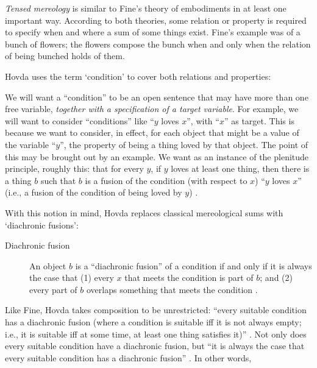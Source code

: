 \documentclass[11pt]{article}
\newenvironment{squote}{%
\begin{spacing}{1}
\begin{list}{}{%
\setlength{\labelwidth}{0pt}%
\rightmargin\leftmargin%
}
\item\relax
}{%
\end{list}%
\end{spacing}
}
\begin{document}
\begin{spacing}{1.5}
{\em Tensed mereology} is similar to Fine's theory of embodiments in
at least one important way.  According to both theories, some relation
or property is required to specify when and where a sum of some things
exist.  Fine's example was of a bunch of flowers; the flowers compose
the bunch when and only when the relation of being bunched holds of
them.

Hovda uses the term `condition' to cover both relations and
properties:

\begin{squote}
We will want a ``condition'' to be an open sentence that may have more
than one free variable, \emph{together with a specification of a
  target variable}. For example, we will want to consider
``conditions'' like ``$y$ loves $x$'', with ``$x$'' as target.  This
is because we want to consider, in effect, for each object that might
be a value of the variable ``$y$'', the property of being a thing
loved by that object.  The point of this may be brought out by an
example.  We want as an instance of the plenitude principle, roughly
this: that for every $y$, if $y$ loves at least one thing, then there
is a thing $b$ such that $b$ is a fusion of the condition (with
respect to $x$) ``$y$ loves $x$'' (i.e., a fusion of the condition of
being loved by $y$) \citeyearpar[sec. 1.1n2]{hovda2011}.
\end{squote}

With this notion in mind, Hovda replaces classical mereological sums
with `diachronic fusions':

\begin{description}
  \item[Diachronic fusion] An object $b$ is a ``diachronic fusion'' of
    a condition if and only if it is always the case that (1) every
    $x$ that meets the condition is part of $b$; and (2) every part of
    $b$ overlaps something that meets the condition
    \citeyearpar[sec. 1.1]{hovda2011}.
\end{description}

Like Fine, Hovda takes composition to be unrestricted: ``every
suitable condition has a diachronic fusion (where a condition is
suitable iff it is not always empty; i.e., it is suitable iff at some
time, at least one thing satisfies it)'' \citeyearpar[sec.
  3.1]{hovda2011}.  Not only does every suitable condition have a
diachronic fusion, but ``it is always the case that every suitable
condition has a diachronic fusion''
\citeyearpar[sec. 3.1.1]{hovda2011}.  In other words,


\end{spacing}
\end{document}
